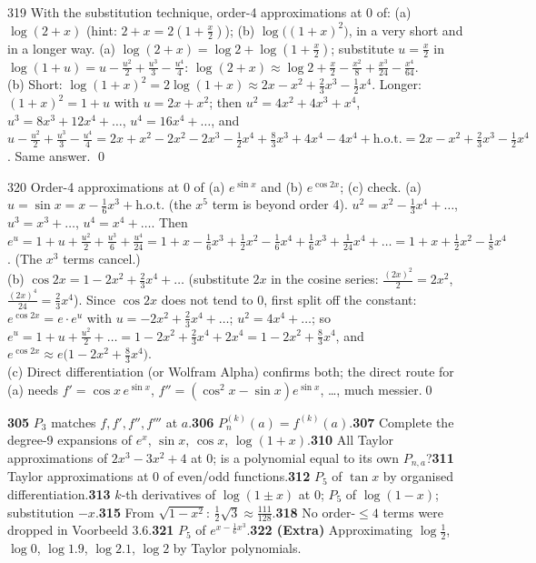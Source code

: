 \begin{bookex}{319}
With the substitution technique, order-4 approximations at $0$ of: (a) $\log(2+x)$ (hint: $2+x=2(1+\frac x2)$); (b) $\log\big((1+x)^2\big)$, in a very short and in a longer way.
\solution
(a) $\log(2+x)=\log2+\log(1+\tfrac x2)$; substitute $u=\frac x2$ in $\log(1+u)=u-\frac{u^2}2+\frac{u^3}3-\frac{u^4}4$: $\log(2+x)\approx\log2+\frac x2-\frac{x^2}8+\frac{x^3}{24}-\frac{x^4}{64}$.\\
(b) Short: $\log(1+x)^2=2\log(1+x)\approx2x-x^2+\frac23x^3-\frac12x^4$. Longer: $(1+x)^2=1+u$ with $u=2x+x^2$; then $u^2=4x^2+4x^3+x^4$, $u^3=8x^3+12x^4+\dots$, $u^4=16x^4+\dots$, and $u-\frac{u^2}2+\frac{u^3}3-\frac{u^4}4=2x+x^2-2x^2-2x^3-\frac12x^4+\frac83x^3+4x^4-4x^4+\text{h.o.t.}=2x-x^2+\frac23x^3-\frac12x^4$. Same answer. \checkmark\qed
\end{bookex}

\begin{bookex}{320}
Order-4 approximations at $0$ of (a) $e^{\sin x}$ and (b) $e^{\cos2x}$; (c) check.
\solution
(a) $u=\sin x=x-\frac16x^3+\text{h.o.t.}$ (the $x^5$ term is beyond order 4). $u^2=x^2-\frac13x^4+\dots$, $u^3=x^3+\dots$, $u^4=x^4+\dots$. Then $e^u=1+u+\frac{u^2}2+\frac{u^3}6+\frac{u^4}{24}=1+x-\frac16x^3+\frac12x^2-\frac16x^4+\frac16x^3+\frac1{24}x^4+\dots=1+x+\frac12x^2-\frac18x^4$. (The $x^3$ terms cancel.)\\
(b) $\cos2x=1-2x^2+\frac23x^4+\dots$ (substitute $2x$ in the cosine series: $\frac{(2x)^2}2=2x^2$, $\frac{(2x)^4}{24}=\frac23x^4$). Since $\cos2x$ does not tend to $0$, first split off the constant: $e^{\cos2x}=e\cdot e^{u}$ with $u=-2x^2+\frac23x^4+\dots$; $u^2=4x^4+\dots$; so $e^u=1+u+\frac{u^2}2+\dots=1-2x^2+\frac23x^4+2x^4=1-2x^2+\frac83x^4$, and $e^{\cos2x}\approx e\big(1-2x^2+\frac83x^4\big)$.\\
(c) Direct differentiation (or Wolfram Alpha) confirms both; the direct route for (a) needs $f'=\cos x\,e^{\sin x}$, $f''=(\cos^2x-\sin x)e^{\sin x}$, \dots, much messier.\qed
\end{bookex}

\begin{trybox}[{305, 306, 307, 310, 311, 312, 313, 315, 318, 321, 322 (Extra)}]
\textbf{305} $P_3$ matches $f,f',f'',f'''$ at $a$.\quad \textbf{306} $P_n^{(k)}(a)=f^{(k)}(a)$.\quad \textbf{307} Complete the degree-9 expansions of $e^x$, $\sin x$, $\cos x$, $\log(1+x)$.\quad \textbf{310} All Taylor approximations of $2x^3-3x^2+4$ at $0$; is a polynomial equal to its own $P_{n,a}$?\quad \textbf{311} Taylor approximations at $0$ of even/odd functions.\quad \textbf{312} $P_5$ of $\tan x$ by organised differentiation.\quad \textbf{313} $k$-th derivatives of $\log(1\pm x)$ at $0$; $P_5$ of $\log(1-x)$; substitution $-x$.\quad \textbf{315} From $\sqrt{1-x^2}$: $\frac12\sqrt3\approx\frac{111}{128}$.\quad \textbf{318} No order-$\le4$ terms were dropped in Voorbeeld 3.6.\quad \textbf{321} $P_5$ of $e^{x-\frac16x^3}$.\quad \textbf{322 (Extra)} Approximating $\log\frac12$, $\log0$, $\log1.9$, $\log2.1$, $\log2$ by Taylor polynomials.
\end{trybox}

